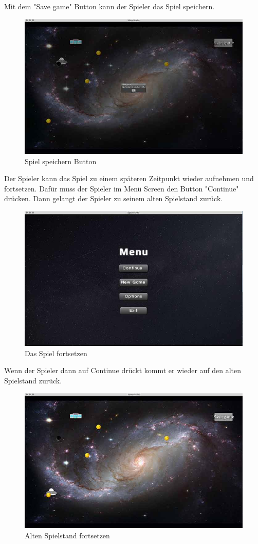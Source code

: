 \documentclass[12pt]{article}
\begin{document}
Mit dem "Save game" Button kann der Spieler das Spiel speichern.\\
\begin{figure}[htp]
	\centering
	\includegraphics[scale=0.6]{TestProtocolBilder/save@0,25x.jpg}
	\caption{Spiel speichern Button}
\end{figure}
\clearpage
Der Spieler kann das Spiel zu einem späteren Zeitpunkt wieder aufnehmen und fortsetzen. Dafür muss der Spieler im Menü Screen den Button "Continue" drücken. Dann gelangt der Spieler zu seinem alten Spielstand zurück.
\begin{figure}[htp]
	\centering
	\includegraphics[scale=0.6]{TestProtocolBilder/continuebutton@0,25x.jpg}
	\caption{Das Spiel fortsetzen}
\end{figure}
\clearpage
Wenn der Spieler dann auf Continue drückt kommt er wieder auf den alten Spielstand zurück.
\begin{figure}[htp]
	\centering
	\includegraphics[scale=0.6]{TestProtocolBilder/continueScreen@0,25x.jpg}
	\caption{Alten Spielstand fortsetzen}
\end{figure}
\end{document}
